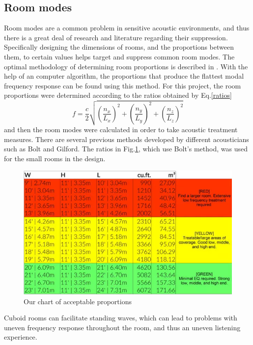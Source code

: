 \documentclass[10pt, twocolumn]{article}
\begin{document}
        \subsection{Room modes}
        Room modes are a common problem in sensitive acoustic environments, and thus there is a great deal of research and literature regarding their suppression.
        Specifically designing the dimensions of rooms, and the proportions between them, to certain values helps target and suppress common room modes.
        The optimal methodology of determining room proportions is described in \cite{Cox}. With the help of an computer algorithm, the proportions that produce the flattest modal frequency response can be found using this method.
        For this project, the room proportions were determined according to the ratios obtained by Eq.\ref{ratios}
        \begin{equation}\label{ratios}
            f = \frac{c}{2}\sqrt{(\frac{n_x}{L_x})^2+(\frac{n_y}{L_y})^2+(\frac{n_z}{L_z})^2}
        \end{equation}
        and then the room modes were calculated in order to take acoustic treatment measures.
        There are several previous methods developed by different acousticians such as Bolt\cite{Bolt} and Gilford\cite{Gilford}.
        The ratios in Fig.\ref{bolty}, which use Bolt's method, was used for the small rooms in the design.
        \begin{figure}[H]
            \centering
            \includegraphics[scale=0.5]{resources/modey.png}
            \caption{Our chart of acceptable proportions}
            \label{bolty}
        \end{figure}
        Cuboid rooms can facilitate standing waves, which can lead to problems with uneven frequency response throughout the room, and thus an uneven listening experience.
\end{document}
